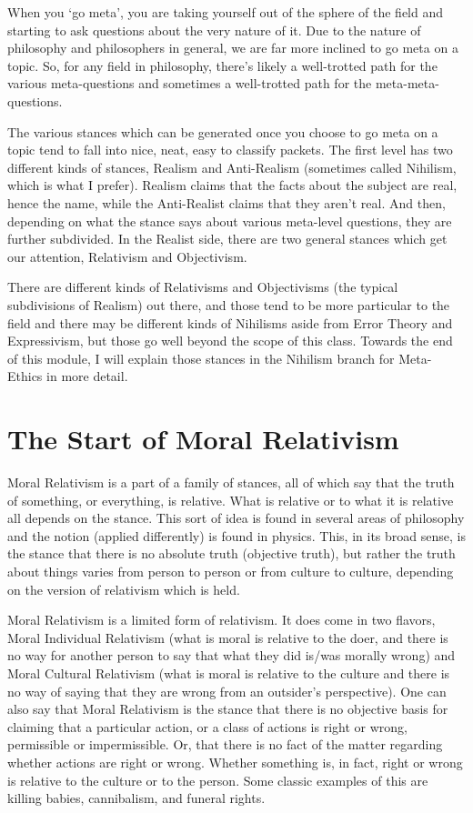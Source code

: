 When you ‘go meta’, you are taking yourself out of the sphere of the field and starting to ask questions about the very nature of it. Due to the nature of philosophy and philosophers in general, we are far more inclined to go meta on a topic. So, for any field in philosophy, there’s likely a well-trotted path for the various meta-questions and sometimes a well-trotted path for the meta-meta-questions.

The various stances which can be generated once you choose to go meta on a topic tend to fall into nice, neat, easy to classify packets. The first level has two different kinds of stances, Realism and Anti-Realism (sometimes called Nihilism, which is what I prefer). Realism claims that the facts about the subject are real, hence the name, while the Anti-Realist claims that they aren't real. And then, depending on what the stance says about various meta-level questions, they are further subdivided. In the Realist side, there are two general stances which get our attention, Relativism and Objectivism.

There are different kinds of Relativisms and Objectivisms (the typical subdivisions of Realism) out there, and those tend to be more particular to the field and there may be different kinds of Nihilisms aside from Error Theory and Expressivism, but those go well beyond the scope of this class. Towards the end of this module, I will explain those stances in the Nihilism branch for Meta-Ethics in more detail.

\section{The Start of Moral Relativism}

Moral Relativism is a part of a family of stances, all of which say that the truth of something, or everything, is relative. What is relative or to what it is relative all depends on the stance. This sort of idea is found in several areas of philosophy and the notion (applied differently) is found in physics. This, in its broad sense, is the stance that there is no absolute truth (objective truth), but rather the truth about things varies from person to person or from culture to culture, depending on the version of relativism which is held.

Moral Relativism is a limited form of relativism. It does come in two flavors, Moral Individual Relativism (what is moral is relative to the doer, and there is no way for another person to say that what they did is/was morally wrong) and Moral Cultural Relativism (what is moral is relative to the culture and there is no way of saying that they are wrong from an outsider's perspective). One can also say that Moral Relativism is the stance that there is no objective basis for claiming that a particular action, or a class of actions is right or wrong, permissible or impermissible. Or, that there is no fact of the matter regarding whether actions are right or wrong. Whether something is, in fact, right or wrong is relative to the culture or to the person. Some classic examples of this are killing babies, cannibalism, and funeral rights.

